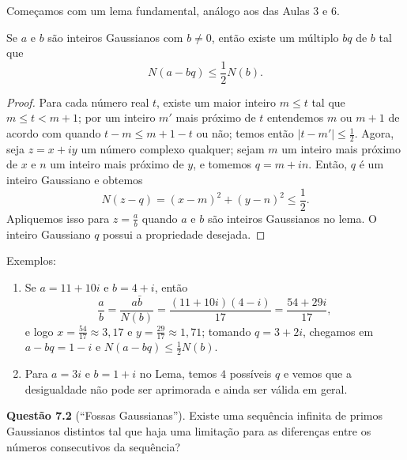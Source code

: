 Começamos com um lema fundamental, análogo aos das Aulas 3 e 6.

\begin{lema}
Se $a$ e $b$ são inteiros Gaussianos com $b \neq 0$, então existe um
múltiplo $bq$ de $b$ tal que
\[
N(a - bq) \le \frac{1}{2} N(b).
\]  
\end{lema}

\begin{proof}
Para cada número real $t$, existe um maior inteiro $m \le t$ tal que
$m \le t < m + 1$; por um inteiro $m'$ mais próximo de $t$ entendemos
$m$ ou $m + 1$ de acordo com quando $t - m \le m + 1 - t$ ou não; temos
então $|t - m'| \le \frac{1}{2}$. Agora, seja $z = x + iy$ um número
complexo qualquer; sejam $m$ um inteiro mais próximo de $x$ e $n$ um
inteiro mais próximo de $y$, e tomemos $q = m + in$. Então, $q$ é um
inteiro Gaussiano e obtemos
\[
N(z - q) = (x - m)^2 + (y - n)^2 \le \frac{1}{2}.
\]
Apliquemos isso para $z = \frac{a}{b}$ quando $a$ e $b$ são inteiros Gaussianos
no lema. O inteiro Gaussiano $q$ possui a propriedade desejada.    
\end{proof}

Exemplos:

\begin{enumerate}
\item[(1)] Se $a = 11 + 10i$ e $b = 4 + i$, então
\[
\frac{a}{b} = \frac{a\bar{b}}{N(b)}
= \frac{(11 + 10i)(4 - i)}{17}
= \frac{54 + 29i}{17},
\]
e logo $x = \frac{54}{17} \approx 3{,}17$ e $y = \frac{29}{17} \approx 1{,}71$;
tomando $q = 3 + 2i$, chegamos em $a - bq = 1 - i$ e $N(a - bq) \le \frac{1}{2} N(b)$.

\item[(2)] Para $a = 3i$ e $b = 1 + i$ no Lema, temos $4$ possíveis $q$ e
vemos que a desigualdade não pode ser aprimorada e ainda ser válida em geral.
\end{enumerate}

\textbf{Questão 7.2} (“Fossas Gaussianas”).
Existe uma sequência infinita de primos Gaussianos distintos tal que haja uma
limitação para as diferenças entre os números consecutivos da sequência?
